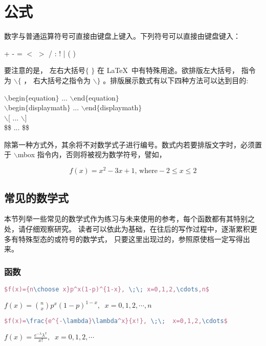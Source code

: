 
\chapter{公式}
\song\wuhao
数字与普通运算符号可直接由键盘上键入。下列符号可以直接由键盘键入：

        \begin{center}
                    + \;-\; =\; $<$\; $>$ \;/ \;:\; !\; | \;[\; ] \;(\; )\\
        \end{center}
		
要注意的是， 左右大括号$\{$ $\}$ 在 \LaTeX\ 中有特殊用途。欲排版左大括号， 指令为 $\backslash \{$ ，
右大括号之指令为 $\backslash \}$ 。排版展示数式有以下四种方法可以达到目的:
        \begin{center}
$\backslash$begin$\{$equation$\}$ ... $\backslash$end$\{$equation$\}$\\
$\backslash$begin$\{$displaymath$\}$ ... $\backslash$end$\{$displaymath$\}$\\
$\backslash$[ ... $\backslash$]\\
\$\$ ... \$\$
        \end{center}
除第一种方式外，其余将不对数学式子进行编号。数式内若要排版文字时，必须置于
$\backslash$mbox 指令内，否则将被视为数学符号，譬如，

$$f(x)=x^2-3x+1 \mbox{, where} -2 \leq x \leq 2$$
\section{常见的数学式}
本节列举一些常见的数学式作为练习与未来使用的参考，每个函数都有其特别之处，请仔细观察研究。
读者可以依此为基础，在往后的写作过程中，逐渐累积更多有特殊型态的或符号的数学式，
只要这里出现过的，参照原使档一定写得出来。

\subsection{函数}
    \begin{lstlisting}[language=TeX,numbers=none,frame=lrtb,label=Binomial,caption=Binomial] 
  $f(x)={n\choose x}p^x(1-p)^{1-x}, \;\; x=0,1,2,\cdots,n$ 
  \end{lstlisting}
  $f(x)={n\choose x}p^x(1-p)^{1-x}, \;\; x=0,1,2,\cdots,n$ 
   
  \begin{lstlisting}[language=TeX,numbers=none,frame=lrtb,label=Poisson,caption=Poisson] 
  $f(x)=\frac{e^{-\lambda}\lambda^x}{x!}, \;\;  x=0,1,2,\cdots$ 
  \end{lstlisting}
  $f(x)=\frac{e^{-\lambda}\lambda^x}{x!}, \;\;  x=0,1,2,\cdots$
  
